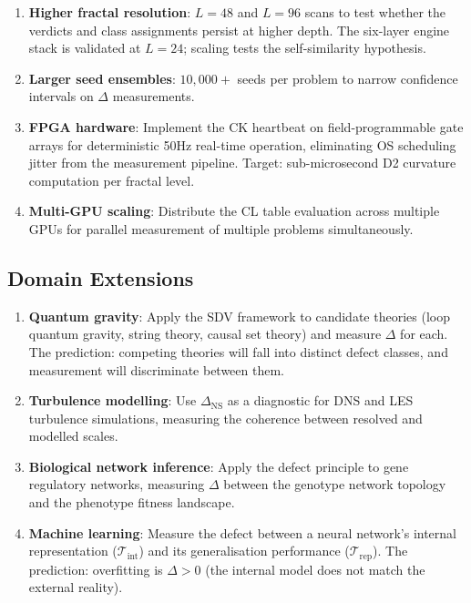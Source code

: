 \documentclass[12pt, openany]{book}
\theoremstyle{remark}
\newcommand{\Tint}{\mathcal{T}_{\mathrm{int}}}
\newcommand{\Trep}{\mathcal{T}_{\mathrm{rep}}}
\begin{document}
\begin{enumerate}
  \item \textbf{Higher fractal resolution}: $L = 48$ and $L = 96$ scans to test
        whether the verdicts and class assignments persist at higher depth.
        The six-layer engine stack is validated at $L = 24$; scaling tests
        the self-similarity hypothesis.
  \item \textbf{Larger seed ensembles}: $10{,}000{+}$ seeds per problem to
        narrow confidence intervals on $\Delta$ measurements.
  \item \textbf{FPGA hardware}: Implement the CK heartbeat on field-programmable
        gate arrays for deterministic 50Hz real-time operation, eliminating
        OS scheduling jitter from the measurement pipeline. Target: sub-microsecond
        D2 curvature computation per fractal level.
  \item \textbf{Multi-GPU scaling}: Distribute the CL table evaluation across
        multiple GPUs for parallel measurement of multiple problems simultaneously.
\end{enumerate}

\subsection{Domain Extensions}

\begin{enumerate}
  \item \textbf{Quantum gravity}: Apply the SDV framework to candidate theories
        (loop quantum gravity, string theory, causal set theory) and measure
        $\Delta$ for each. The prediction: competing theories will fall into
        distinct defect classes, and measurement will discriminate between them.
  \item \textbf{Turbulence modelling}: Use $\Delta_{\mathrm{NS}}$ as a diagnostic
        for DNS and LES turbulence simulations, measuring the coherence between
        resolved and modelled scales.
  \item \textbf{Biological network inference}: Apply the defect principle to
        gene regulatory networks, measuring $\Delta$ between the genotype network
        topology and the phenotype fitness landscape.
  \item \textbf{Machine learning}: Measure the defect between a neural network's
        internal representation ($\Tint$) and its generalisation performance
        ($\Trep$). The prediction: overfitting is $\Delta > 0$ (the internal
        model does not match the external reality).
\end{enumerate}
\end{document}
